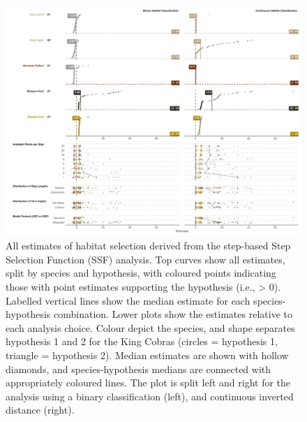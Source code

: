 \documentclass[10pt,a4paper]{article}
\begin{document}
\begin{figure}
\includegraphics[width=1\linewidth]{../../figures/specCurve_ssf} \caption{All estimates of habitat selection derived from the step-based Step Selection Function (SSF) analysis. Top curves show all estimates, split by species and hypothesis, with coloured points indicating those with point estimates supporting the hypothesis (i.e., > 0). Labelled vertical lines show the median estimate for each species-hypothesis combination. Lower plots show the estimates relative to each analysis choice. Colour depict the species, and shape separates hypothesis 1 and 2 for the King Cobras (circles = hypothesis 1, triangle = hypothesis 2). Median estimates are shown with hollow diamonds, and species-hypothesis medians are connected with appropriately coloured lines. The plot is split left and right for the analysis using a binary classification (left), and continuous inverted distance (right).}\label{fig:specCurveSsf}
\end{figure}
\end{document}
